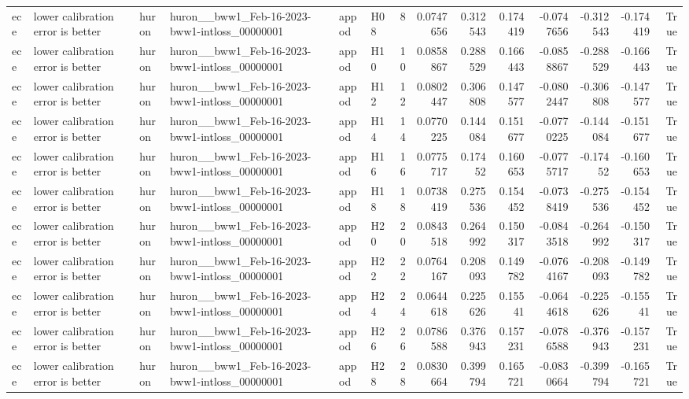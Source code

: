 \begin{longtable}{llllllrrrrrrrr}
ece & lower calibration error is better & huron & huron\_\_bww1\_Feb-16-2023-bww1-intloss\_00000001 & appod & H08 & 8 & 0.0747656 & 0.312543 & 0.174419 & -0.0747656 & -0.312543 & -0.174419 & True \\
ece & lower calibration error is better & huron & huron\_\_bww1\_Feb-16-2023-bww1-intloss\_00000001 & appod & H10 & 10 & 0.0858867 & 0.288529 & 0.166443 & -0.0858867 & -0.288529 & -0.166443 & True \\
ece & lower calibration error is better & huron & huron\_\_bww1\_Feb-16-2023-bww1-intloss\_00000001 & appod & H12 & 12 & 0.0802447 & 0.306808 & 0.147577 & -0.0802447 & -0.306808 & -0.147577 & True \\
ece & lower calibration error is better & huron & huron\_\_bww1\_Feb-16-2023-bww1-intloss\_00000001 & appod & H14 & 14 & 0.0770225 & 0.144084 & 0.151677 & -0.0770225 & -0.144084 & -0.151677 & True \\
ece & lower calibration error is better & huron & huron\_\_bww1\_Feb-16-2023-bww1-intloss\_00000001 & appod & H16 & 16 & 0.0775717 & 0.17452 & 0.160653 & -0.0775717 & -0.17452 & -0.160653 & True \\
ece & lower calibration error is better & huron & huron\_\_bww1\_Feb-16-2023-bww1-intloss\_00000001 & appod & H18 & 18 & 0.0738419 & 0.275536 & 0.154452 & -0.0738419 & -0.275536 & -0.154452 & True \\
ece & lower calibration error is better & huron & huron\_\_bww1\_Feb-16-2023-bww1-intloss\_00000001 & appod & H20 & 20 & 0.0843518 & 0.264992 & 0.150317 & -0.0843518 & -0.264992 & -0.150317 & True \\
ece & lower calibration error is better & huron & huron\_\_bww1\_Feb-16-2023-bww1-intloss\_00000001 & appod & H22 & 22 & 0.0764167 & 0.208093 & 0.149782 & -0.0764167 & -0.208093 & -0.149782 & True \\
ece & lower calibration error is better & huron & huron\_\_bww1\_Feb-16-2023-bww1-intloss\_00000001 & appod & H24 & 24 & 0.0644618 & 0.225626 & 0.15541 & -0.0644618 & -0.225626 & -0.15541 & True \\
ece & lower calibration error is better & huron & huron\_\_bww1\_Feb-16-2023-bww1-intloss\_00000001 & appod & H26 & 26 & 0.0786588 & 0.376943 & 0.157231 & -0.0786588 & -0.376943 & -0.157231 & True \\
ece & lower calibration error is better & huron & huron\_\_bww1\_Feb-16-2023-bww1-intloss\_00000001 & appod & H28 & 28 & 0.0830664 & 0.399794 & 0.165721 & -0.0830664 & -0.399794 & -0.165721 & True \\

\end{longtable}
